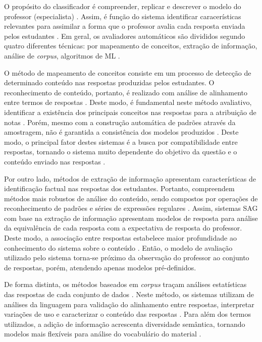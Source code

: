O propósito do classificador é compreender, replicar e descrever o modelo do professor (especialista) \cite{yang2021}. Assim, é função do sistema identificar caracerísticas relevantes para assimilar a forma que o professor avalia cada resposta enviada pelos estudantes \cite{jordan2012, mao2018}. Em geral, os avaliadores automáticos são divididos segundo quatro diferentes técnicas: por mapeamento de conceitos, extração de informação, análise de \textit{corpus}, algoritmos de ML \cite{burrows2015}. 

O método de mapeamento de conceitos consiste em um processo de detecção de determinado conteúdo nas respostas produzidas pelos estudantes. O reconhecimento de conteúdo, portanto, é realizado com análise de alinhamento entre termos de respostas \cite{jimenez2013}. Deste modo, é fundamental neste método avaliativo, identificar a existência dos principais conceitos nas respostas para a atribuição de notas \cite{kar2017, chakraborty2017}. Porém, mesmo com a construção automática de padrões através da amostragem, não é garantida a consistência dos modelos produzidos \cite{azad2020}. Deste modo, o principal fator destes sistemas é a busca por compatibilidade entre respostas, tornando o sistema muito dependente do objetivo da questão e o conteúdo enviado nas respostas \cite{filighera2020}.

Por outro lado, métodos de extração de informação apresentam características de identificação factual nas respostas dos estudantes. Portanto, compreendem métodos mais robustos de análise do conteúdo, sendo compostos por operações de reconhecimento de padrões e séries de expressões regulares \cite{ramachandran2015b, butcher2010}. Assim, sistemas SAG com base na extração de informação apresentam modelos de resposta para análise da equivalência de cada resposta com a expectativa de resposta do professor. Deste modo, a associação entre respostas estabelece maior profundidade ao conhecimento do sistema sobre o conteúdo \cite{tan2020}. Então, o modelo de avaliação utilizado pelo sistema torna-se próximo da observação do professor ao conjunto de respostas, porém, atendendo apenas modelos pré-definidos.

De forma distinta, os métodos baseados em \textit{corpus} traçam análises estatísticas das respostas de cada conjunto de dados \cite{kumar2019}. Neste método, os sistemas utilizam de análises da linguagem para validação do alinhamento entre respostas, interpretar variações de uso e caracterizar o conteúdo das respostas \cite{ziai2012, menini2019}. Para além dos termos utilizados, a adição de informação acrescenta diversidade semântica, tornando modelos mais flexíveis para análise do vocabulário do material \cite{fowler2021}.

